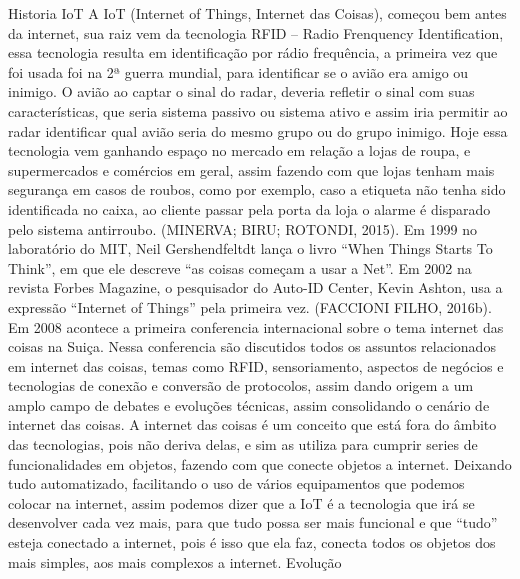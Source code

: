 \setlength{\absparsep}{18pt} %
\begin{desenvolvimento}
 Historia IoT
 A IoT (Internet of Things, Internet das Coisas), começou bem antes da internet, sua raiz vem da tecnologia RFID – Radio Frenquency Identification, essa tecnologia resulta em identificação por rádio frequência, a primeira vez que foi usada foi na 2ª guerra mundial, para identificar se o avião era amigo ou inimigo. O avião ao captar o sinal do radar, deveria refletir o sinal com suas características, que seria sistema passivo ou sistema ativo e assim iria permitir ao radar identificar qual avião seria do mesmo grupo ou do grupo inimigo. Hoje essa tecnologia vem ganhando espaço no mercado em relação a lojas de roupa, e supermercados e comércios em geral, assim fazendo com que lojas tenham mais segurança em casos de roubos, como por exemplo, caso a etiqueta não tenha sido identificada no caixa, ao cliente passar pela porta da loja o alarme é disparado pelo sistema antirroubo. (MINERVA; BIRU; ROTONDI, 2015).
 Em 1999 no laboratório do MIT, Neil Gershendfeltdt lança o livro “When Things Starts To Think”, em que ele descreve “as coisas começam a usar a Net”. Em 2002 na revista Forbes Magazine, o pesquisador do Auto-ID Center, Kevin Ashton, usa a expressão “Internet of Things” pela primeira vez. (FACCIONI FILHO, 2016b).
 Em 2008 acontece a primeira conferencia internacional sobre o tema internet das coisas na Suiça. Nessa conferencia são discutidos todos os assuntos relacionados em internet das coisas, temas como RFID, sensoriamento, aspectos de negócios e tecnologias de conexão e conversão de protocolos, assim dando origem a um amplo campo de debates e evoluções técnicas, assim consolidando o cenário de internet das coisas.
 A internet das coisas é um conceito que está fora do âmbito das tecnologias, pois não deriva delas, e sim as utiliza para cumprir series de funcionalidades em objetos, fazendo com que conecte objetos a internet. Deixando tudo automatizado, facilitando o uso de vários equipamentos que podemos colocar na internet, assim podemos dizer que a IoT é a tecnologia que irá se desenvolver cada vez mais, para que tudo possa ser mais funcional e que “tudo” esteja conectado a internet, pois é isso que ela faz, conecta todos os objetos dos mais simples, aos mais complexos a internet.
 Evolução
  
\end{desenvolvimento}